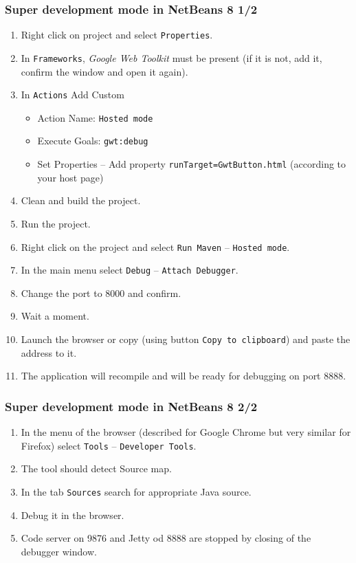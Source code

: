\documentclass[10pt,table, xcolor=pdflatex]{beamer}
\begin{document}
\begin{frame}\frametitle{Super development mode in NetBeans 8 1/2}
  \begin{enumerate}
    \item Right click on project and select \texttt{Properties}.
    \item In \texttt{Frameworks}, \textit{Google Web Toolkit} must be present (if it is not, add it, confirm the window and open it again).
    \item In \texttt{Actions} Add Custom
      \begin{itemize}
        \item Action Name: \texttt{Hosted mode}
        \item Execute Goals: \texttt{gwt:debug}
        \item Set Properties -- Add property \texttt{runTarget=GwtButton.html} (according to your host page)
      \end{itemize}
    \item Clean and build the project.
    \item Run the project.
    \item Right click on the project and select \texttt{Run Maven} -- \texttt{Hosted mode}.
    \item In the main menu select \texttt{Debug} -- \texttt{Attach Debugger}.
    \item Change the port to 8000 and confirm.
    \item Wait a moment.
    \item Launch the browser or copy (using button \texttt{Copy to clipboard}) and paste the address to it.
    \item The application will recompile and will be ready for debugging on port 8888.
  \end{enumerate}
\end{frame}


\begin{frame}\frametitle{Super development mode in NetBeans 8 2/2}
  \begin{enumerate}
    \item In the menu of the browser (described for Google Chrome but very similar for Firefox) select \texttt{Tools} -- \texttt{Developer Tools}.
    \item The tool should detect Source map.
    \item In the tab \texttt{Sources} search for appropriate Java source.
    \item Debug it in the browser.
    \item Code server on 9876 and Jetty od 8888 are stopped by closing of the debugger window.
  \end{enumerate}
\end{frame}
\end{document}
